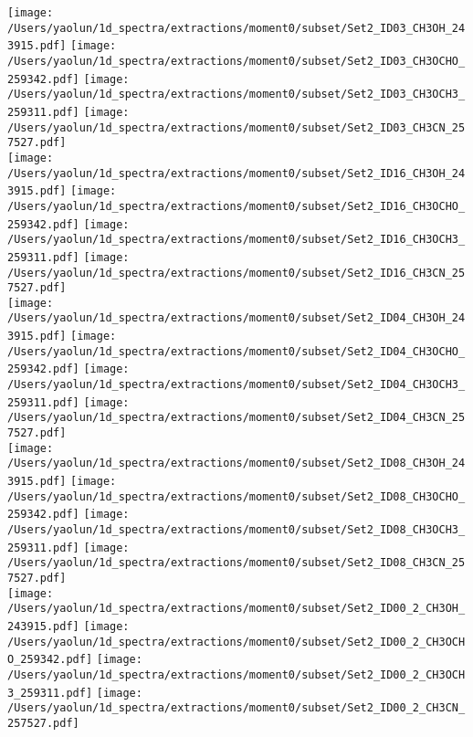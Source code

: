 \addtocounter{figure}{-1}
\begin{figure*}[htbp!]
  \centering
  \texttt{[image: /Users/yaolun/1d\_spectra/extractions/moment0/subset/Set2\_ID03\_CH3OH\_243915.pdf]}
  \texttt{[image: /Users/yaolun/1d\_spectra/extractions/moment0/subset/Set2\_ID03\_CH3OCHO\_259342.pdf]}
  \texttt{[image: /Users/yaolun/1d\_spectra/extractions/moment0/subset/Set2\_ID03\_CH3OCH3\_259311.pdf]}
  \texttt{[image: /Users/yaolun/1d\_spectra/extractions/moment0/subset/Set2\_ID03\_CH3CN\_257527.pdf]}
  \\
  \texttt{[image: /Users/yaolun/1d\_spectra/extractions/moment0/subset/Set2\_ID16\_CH3OH\_243915.pdf]}
  \texttt{[image: /Users/yaolun/1d\_spectra/extractions/moment0/subset/Set2\_ID16\_CH3OCHO\_259342.pdf]}
  \texttt{[image: /Users/yaolun/1d\_spectra/extractions/moment0/subset/Set2\_ID16\_CH3OCH3\_259311.pdf]}
  \texttt{[image: /Users/yaolun/1d\_spectra/extractions/moment0/subset/Set2\_ID16\_CH3CN\_257527.pdf]}
  \\
  \texttt{[image: /Users/yaolun/1d\_spectra/extractions/moment0/subset/Set2\_ID04\_CH3OH\_243915.pdf]}
  \texttt{[image: /Users/yaolun/1d\_spectra/extractions/moment0/subset/Set2\_ID04\_CH3OCHO\_259342.pdf]}
  \texttt{[image: /Users/yaolun/1d\_spectra/extractions/moment0/subset/Set2\_ID04\_CH3OCH3\_259311.pdf]}
  \texttt{[image: /Users/yaolun/1d\_spectra/extractions/moment0/subset/Set2\_ID04\_CH3CN\_257527.pdf]}
  \\
  \texttt{[image: /Users/yaolun/1d\_spectra/extractions/moment0/subset/Set2\_ID08\_CH3OH\_243915.pdf]}
  \texttt{[image: /Users/yaolun/1d\_spectra/extractions/moment0/subset/Set2\_ID08\_CH3OCHO\_259342.pdf]}
  \texttt{[image: /Users/yaolun/1d\_spectra/extractions/moment0/subset/Set2\_ID08\_CH3OCH3\_259311.pdf]}
  \texttt{[image: /Users/yaolun/1d\_spectra/extractions/moment0/subset/Set2\_ID08\_CH3CN\_257527.pdf]}
  \\
  \texttt{[image: /Users/yaolun/1d\_spectra/extractions/moment0/subset/Set2\_ID00\_2\_CH3OH\_243915.pdf]}
  \texttt{[image: /Users/yaolun/1d\_spectra/extractions/moment0/subset/Set2\_ID00\_2\_CH3OCHO\_259342.pdf]}
  \texttt{[image: /Users/yaolun/1d\_spectra/extractions/moment0/subset/Set2\_ID00\_2\_CH3OCH3\_259311.pdf]}
  \texttt{[image: /Users/yaolun/1d\_spectra/extractions/moment0/subset/Set2\_ID00\_2\_CH3CN\_257527.pdf]}
  \\
  \caption{}
\end{figure*}
